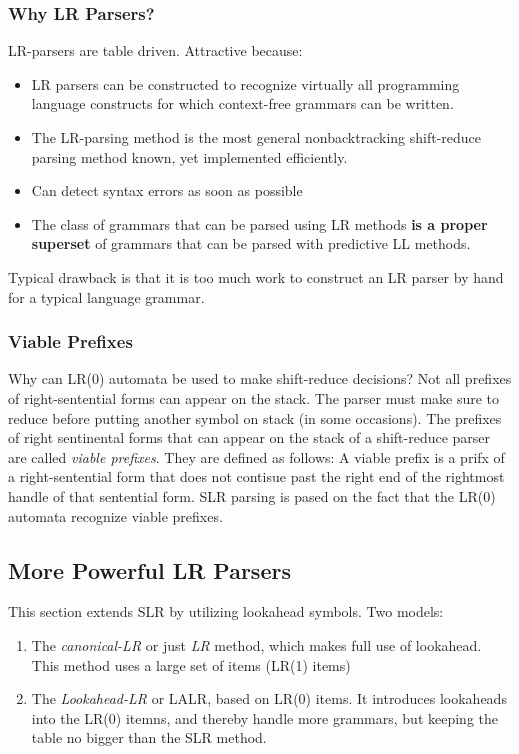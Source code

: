 \documentclass{article}
\begin{document}
\subsubsection{Why LR Parsers?} %
\label{ssub:Why LR Parsers?}
LR-parsers are table driven. Attractive because:
\begin{itemize}
	\item LR parsers can be constructed to recognize virtually all programming language constructs for which context-free grammars can be written.
	\item The LR-parsing method is the most general nonbacktracking shift-reduce parsing method known, yet implemented efficiently.
	\item Can detect syntax errors as soon as possible
	\item The class of grammars that can be parsed using LR methods \textbf{is a proper superset} of grammars that can be parsed with predictive LL methods. 
\end{itemize}
Typical drawback is that it is too much work to construct an LR parser by hand for a typical language grammar.

\subsubsection{Viable Prefixes} %
\label{ssub:Viable Prefixes}
Why can LR(0) automata be used to make shift-reduce decisions? Not all prefixes of right-sentential forms can appear on the stack. The parser must make sure to reduce before putting another symbol on stack (in some occasions). The prefixes of right sentinental forms that can appear on the stack of a shift-reduce parser are called \emph{viable prefixes}. They are defined as follows: A viable prefix is a prifx of a right-sentential form that does not contisue past the right end of the rightmost handle of that sentential form. SLR parsing is pased on the fact that the LR(0) automata recognize viable prefixes.


\subsection{More Powerful LR Parsers} %
\label{sub:More Powerful LR Parsers}
This section extends SLR by utilizing lookahead symbols. Two models:
\begin{enumerate}
	\item The \emph{canonical-LR} or just \emph{LR} method, which makes full use of lookahead. This method uses a large set of items (LR(1) items)
	\item The \emph{Lookahead-LR} or LALR, based on LR(0) items. It introduces lookaheads into the LR(0) itemns, and thereby handle more grammars, but keeping the table no bigger than the SLR method.
\end{enumerate}
\end{document}
